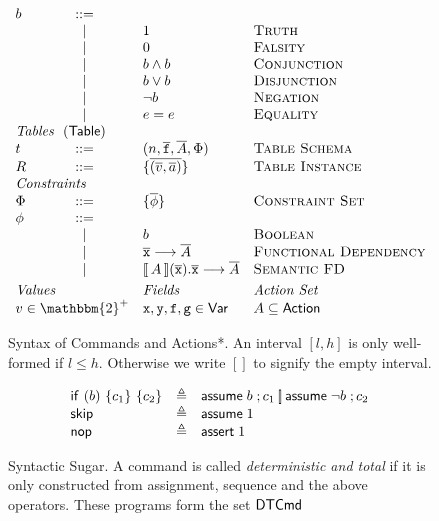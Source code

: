 \begin{figure}[ht]
\[\begin{array}{l c l l}
      b & ::= & \\
        & \mid & \TRUE & \textsc{Truth} \\
        & \mid & \FALSE & \textsc{Falsity} \\
        & \mid & b \wedge b & \textsc{Conjunction} \\
        & \mid & b \vee b & \textsc{Disjunction} \\
        & \mid & \neg b & \textsc{Negation} \\ 
        & \mid & e = e & \textsc{Equality} \\
      \multicolumn 4 l {\textit{Tables}~~(\Table)}\\
      t & ::= & (n,\vec{\var f}, \vec A, \Phi) & \textsc{Table Schema}\\
      R & ::= & \{\overline{(\vec v, \vec a)}\} & \textsc{Table Instance} \\      
      \multicolumn 4 l {\textit{Constraints}}\\
      \Phi & ::= &\{\overline{\phi} \} & \textsc{Constraint Set}\\
      \phi & ::= & \\
        & \mid & b & \textsc{Boolean} \\
        & \mid & \vec {\var x} \longrightarrow \vec A & \textsc{Functional Dependency}\\
        & \mid & \bracbb{A}(\vec{\var x}).\vec{\var x} \longrightarrow \vec A  & \textsc{Semantic FD} \\[.3em]
      \multicolumn{2}{l}{\textit{Values}} & \textit{Fields} & \textit{Action Set}\\
      \multicolumn{2}{l}{v \in \mathbbm{2}^+} & \var x, \var y, \var f, \var g \in \mathsf{Var} & A \subseteq \Action
    \end{array}\]
  \caption{Syntax of Commands and Actions*. An interval $[l, h]$ is
    only well-formed if $l \leq h$. Otherwise we write $[]$ to signify
    the empty interval.}
  \label{fig:syntax}
\end{figure}

\begin{figure}[ht]
  \[\begin{array}{lcl}
      \mathsf{if}~(b)~\{c_1\}~\{c_2\} & \triangleq & \mathsf{assume}\; b\;;c_1 \operatorname*{\left[\!\right]} \mathsf{assume}\; \neg b\;; c_2 \\
      \mathsf{skip} & \triangleq& \mathsf{assume}\; 1\; \\
      \mathsf{nop} & \triangleq & \mathsf{assert}\; 1\;
    \end{array}
  \]
  \caption{Syntactic Sugar. A command is called \emph{deterministic
      and total} if it is only constructed from assignment, sequence
    and the above operators. These programs form the set $\mathsf{DTCmd}$}
  \label{fig:sugar}
\end{figure}

